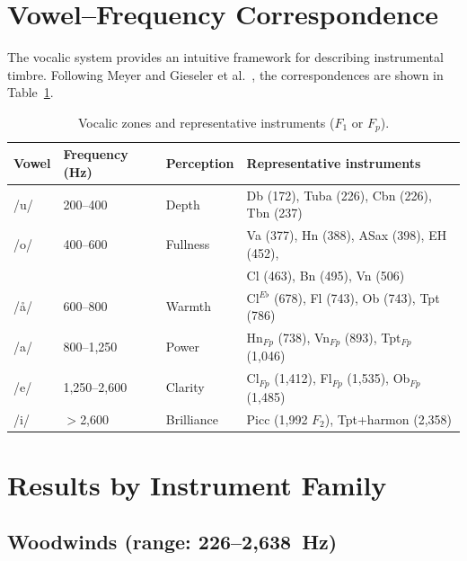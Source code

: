\documentclass[12pt,a4paper]{article}
\begin{document}
\section{Vowel--Frequency Correspondence}

The vocalic system provides an intuitive framework for describing instrumental
timbre. Following Meyer \citep{Meyer2009} and Gieseler et al.\
\citep{Gieseler1985}, the correspondences are shown in
Table~\ref{tab:vowels}.

\begin{table}[htbp]
\centering
\caption{Vocalic zones and representative instruments ($F_1$ or $F_p$).}
\label{tab:vowels}
\begin{tabular}{llll}
\toprule
Vowel & Frequency (Hz) & Perception & Representative instruments \\
\midrule
/u/ & 200--400 & Depth     & Db (172), Tuba (226), Cbn (226), Tbn (237) \\
/o/ & 400--600 & Fullness  & Va (377), Hn (388), ASax (398), EH (452), \\
    &          &           & Cl (463), Bn (495), Vn (506) \\
/\aa/ & 600--800 & Warmth  & Cl$^{E\flat}$ (678), Fl (743), Ob (743), Tpt (786) \\
/a/ & 800--1,250 & Power   & Hn$_{Fp}$ (738), Vn$_{Fp}$ (893), Tpt$_{Fp}$ (1,046) \\
/e/ & 1,250--2,600 & Clarity & Cl$_{Fp}$ (1,412), Fl$_{Fp}$ (1,535), Ob$_{Fp}$ (1,485) \\
/i/ & $>$2,600 & Brilliance & Picc (1,992 $F_2$), Tpt+harmon (2,358) \\
\bottomrule
\end{tabular}
\end{table}

\section{Results by Instrument Family}

\subsection{Woodwinds (range: 226--2,638~Hz)}
\end{document}
